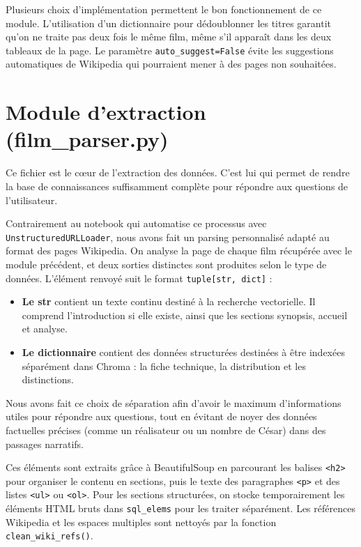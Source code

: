 \documentclass[11pt]{report}
\begin{document}
    Plusieurs choix d'implémentation permettent le bon fonctionnement de ce module. L'utilisation d'un dictionnaire pour dédoublonner les titres garantit qu'on ne traite pas deux fois le même film, même s'il apparaît dans les deux tableaux de la page. Le paramètre \texttt{auto\_suggest=False} évite les suggestions automatiques de Wikipedia qui pourraient mener à des pages non souhaitées.

    \section{Module d'extraction (film\_parser.py)}
 
    Ce fichier est le c\oe{}ur de l'extraction des données. C'est lui qui permet de rendre la base de connaissances suffisamment complète pour répondre aux questions de l'utilisateur.
 
    Contrairement au notebook qui automatise ce processus avec \texttt{UnstructuredURLLoader}, nous avons fait un parsing personnalisé adapté au format des pages Wikipedia. On analyse la page de chaque film récupérée avec le module précédent, et deux sorties distinctes sont produites selon le type de données. L'élément renvoyé suit le format \texttt{tuple[str, dict]} :
 
    \begin{itemize}
        \item \textbf{Le str} contient un texte continu destiné à la recherche vectorielle. Il comprend l'introduction si elle existe, ainsi que les sections synopsis, accueil et analyse.
        \item \textbf{Le dictionnaire} contient des données structurées destinées à être indexées séparément dans Chroma : la fiche technique, la distribution et les distinctions.
    \end{itemize}
 
    Nous avons fait ce choix de séparation afin d'avoir le maximum d'informations utiles pour répondre aux questions, tout en évitant de noyer des données factuelles précises (comme un réalisateur ou un nombre de César) dans des passages narratifs.

    Ces éléments sont extraits grâce à BeautifulSoup en parcourant les balises \texttt{<h2>} pour organiser le contenu en sections, puis le texte des paragraphes \texttt{<p>} et des listes \texttt{<ul>} ou \texttt{<ol>}. Pour les sections structurées, on stocke temporairement les éléments HTML bruts dans \texttt{sql\_elems} pour les traiter séparément. Les références Wikipedia et les espaces multiples sont nettoyés par la fonction \texttt{clean\_wiki\_refs()}.
\end{document}
